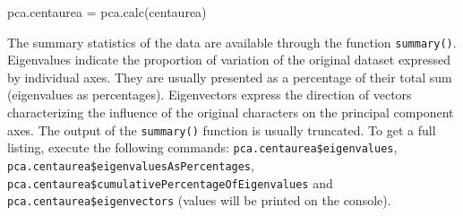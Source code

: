 \documentclass[
  11pt,
  a4paper]{article}
\newenvironment{Shaded}{\begin{snugshade}}{\end{snugshade}}
\newcommand{\FunctionTok}[1]{\textcolor[rgb]{0.00,0.00,0.00}{#1}}
\newcommand{\NormalTok}[1]{#1}
\newcommand{\OtherTok}[1]{\textcolor[rgb]{0.56,0.35,0.01}{#1}}
\begin{document}
\begin{Shaded}
\begin{Highlighting}[]
\NormalTok{pca.centaurea }\OtherTok{=} \FunctionTok{pca.calc}\NormalTok{(centaurea)}
\end{Highlighting}
\end{Shaded}

The summary statistics of the data are available through the function
\texttt{summary()}. Eigenvalues indicate the proportion of variation of
the original dataset expressed by individual axes. They are usually
presented as a percentage of their total sum (eigenvalues as
percentages). Eigenvectors express the direction of vectors
characterizing the influence of the original characters on the principal
component axes. The output of the \texttt{summary()} function is usually
truncated. To get a full listing, execute the following commands:
\texttt{pca.centaurea\$eigenvalues},
\texttt{pca.centaurea\$eigenvaluesAsPercentages},
\texttt{pca.centaurea\$cumulativePercentageOfEigenvalues} and
\texttt{pca.centaurea\$eigenvectors} (values will be printed on the
console).
\end{document}
